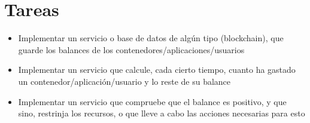 \documentclass[12pt]{extarticle}
\begin{document}
    \section{Tareas}

    \begin{itemize}
        \item Implementar un servicio o base de datos de algún tipo (blockchain), que guarde los balances de los contenedores/aplicaciones/usuarios
        \item Implementar un servicio que calcule, cada cierto tiempo, cuanto ha gastado un contenedor/aplicación/usuario y lo reste de su balance
        \item Implementar un servicio que compruebe que el balance es positivo, y que sino, restrinja los recursos, o que lleve a cabo las acciones necesarias para esto
    \end{itemize}
\end{document}
